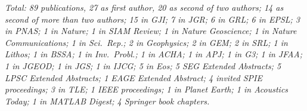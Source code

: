 \documentclass[12pt]{article}
\begin{document}
\emph{Total: 89 publications, 27 as first author, 20 as second of two
  authors; 14 as second of more than two authors; 15 in \emph{GJI}; 7 in
  \emph{JGR}; 6 in \emph{GRL}; 6 in \emph{EPSL}; 3 in \emph{PNAS}; 1 in
  \emph{Nature}; 1 in \emph{SIAM Review}; 1 in \emph{Nature Geoscience}; 1
  in \emph{Nature Communications}; 1 in \emph{Sci.~Rep.}; 2 in
  \emph{Geophysics}; 2 in \emph{GEM}; 2 in \emph{SRL}; 1 in \emph{Lithos}; 1
  in \emph{BSSA}; 1 in \emph{Inv.~Probl.}; 1 in \emph{ACHA}; 1 in
  \emph{APJ}; 1 in \emph{G3}; 1 in \emph{JFAA}; 1 in \emph{JGEOD}; 1 in
  \emph{JGS}; 1 in \emph{IJCG}; 5 in \emph{Eos}; 5 \emph{SEG Extended
    Abstracts}; 5 \emph{LPSC Extended Abstracts}; 1 \emph{EAGE Extended
    Abstract}; 4 invited \emph{SPIE} proceedings; 3 in \emph{TLE}; 1
  \emph{IEEE} proceedings; 1 in \emph{Planet Earth}; 1 in \emph{Acoustics
    Today}; 1 in \emph{MATLAB Digest}; 4 \emph{Springer} book chapters.}

\nocite{Bevis+2019,Dahlen+2008,Galanti+2019,Gualtieri+2020,Harig+2012,Harig+2015a,Kopp+2009,Nolet+2019,Pipatprathanporn+2022,Plattner+2014a,Plattner+2017a,Reuber+2020,Simon+2022,Simons+99,Simons+2003a,Simons+2006a,Simons+2006b,Simons+2009a,Simons+2011b,Simons+2013,Simons2010,Sukhovich+2015,Wang+2012a,Yuan+2014a,Yuan+2015}



\end{document}

